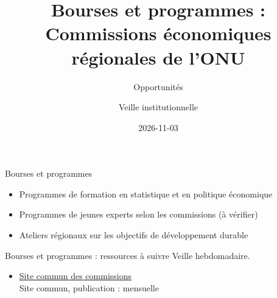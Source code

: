 \documentclass[aspectratio=169,11pt]{beamer}
\title{Bourses et programmes : Commissions économiques régionales de l'ONU}
\subtitle{Opportunités}
\author{Veille institutionnelle}
\date{2026-11-03}
\begin{document}
\begin{frame}\titlepage\end{frame}

\begin{frame}{Bourses et programmes}
\begin{itemize}
\item Programmes de formation en statistique et en politique économique
\item Programmes de jeunes experts selon les commissions (à vérifier)
\item Ateliers régionaux sur les objectifs de développement durable
\end{itemize}
\end{frame}

\begin{frame}{Bourses et programmes : ressources à suivre}
\small
Veille hebdomadaire.
\begin{itemize}
\item \href{https://www.regionalcommissions.org}{Site commun des commissions}\\{\footnotesize Site commun, publication : mensuelle}
\end{itemize}
\end{frame}
\end{document}
